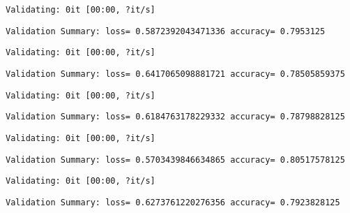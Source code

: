 \documentclass[11pt]{article}
\begin{document}
    
    \begin{Verbatim}[commandchars=\\\{\}]
Validating: 0it [00:00, ?it/s]
    \end{Verbatim}

    
    \begin{Verbatim}[commandchars=\\\{\}]
Validation Summary: loss= 0.5872392043471336 accuracy= 0.7953125
    \end{Verbatim}

    
    \begin{Verbatim}[commandchars=\\\{\}]
Validating: 0it [00:00, ?it/s]
    \end{Verbatim}

    
    \begin{Verbatim}[commandchars=\\\{\}]
Validation Summary: loss= 0.6417065098881721 accuracy= 0.78505859375
    \end{Verbatim}

    
    \begin{Verbatim}[commandchars=\\\{\}]
Validating: 0it [00:00, ?it/s]
    \end{Verbatim}

    
    \begin{Verbatim}[commandchars=\\\{\}]
Validation Summary: loss= 0.6184763178229332 accuracy= 0.78798828125
    \end{Verbatim}

    
    \begin{Verbatim}[commandchars=\\\{\}]
Validating: 0it [00:00, ?it/s]
    \end{Verbatim}

    
    \begin{Verbatim}[commandchars=\\\{\}]
Validation Summary: loss= 0.5703439846634865 accuracy= 0.80517578125
    \end{Verbatim}

    
    \begin{Verbatim}[commandchars=\\\{\}]
Validating: 0it [00:00, ?it/s]
    \end{Verbatim}

    
    \begin{Verbatim}[commandchars=\\\{\}]
Validation Summary: loss= 0.6273761220276356 accuracy= 0.7923828125
    \end{Verbatim}
\end{document}
